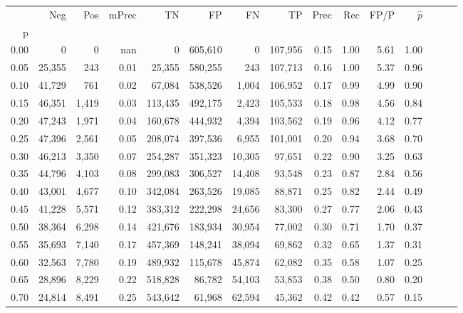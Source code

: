 \begin{tabular}{rrrrrrrrrrrrrrr}
\toprule
{} &     Neg &    Pos & mPrec &       TN &       FP &       FN &       TP &  Prec &   Rec &  FP/P & $\hat{p}$ \\
p    &         &        &       &          &          &          &          &       &       &       &           \\
\midrule
0.00 &       0 &      0 &   nan &        0 &  605,610 &        0 &  107,956 &  0.15 &  1.00 &  5.61 &      1.00 \\
0.05 &  25,355 &    243 &  0.01 &   25,355 &  580,255 &      243 &  107,713 &  0.16 &  1.00 &  5.37 &      0.96 \\
0.10 &  41,729 &    761 &  0.02 &   67,084 &  538,526 &    1,004 &  106,952 &  0.17 &  0.99 &  4.99 &      0.90 \\
0.15 &  46,351 &  1,419 &  0.03 &  113,435 &  492,175 &    2,423 &  105,533 &  0.18 &  0.98 &  4.56 &      0.84 \\
0.20 &  47,243 &  1,971 &  0.04 &  160,678 &  444,932 &    4,394 &  103,562 &  0.19 &  0.96 &  4.12 &      0.77 \\
0.25 &  47,396 &  2,561 &  0.05 &  208,074 &  397,536 &    6,955 &  101,001 &  0.20 &  0.94 &  3.68 &      0.70 \\
0.30 &  46,213 &  3,350 &  0.07 &  254,287 &  351,323 &   10,305 &   97,651 &  0.22 &  0.90 &  3.25 &      0.63 \\
0.35 &  44,796 &  4,103 &  0.08 &  299,083 &  306,527 &   14,408 &   93,548 &  0.23 &  0.87 &  2.84 &      0.56 \\
0.40 &  43,001 &  4,677 &  0.10 &  342,084 &  263,526 &   19,085 &   88,871 &  0.25 &  0.82 &  2.44 &      0.49 \\
0.45 &  41,228 &  5,571 &  0.12 &  383,312 &  222,298 &   24,656 &   83,300 &  0.27 &  0.77 &  2.06 &      0.43 \\
0.50 &  38,364 &  6,298 &  0.14 &  421,676 &  183,934 &   30,954 &   77,002 &  0.30 &  0.71 &  1.70 &      0.37 \\
0.55 &  35,693 &  7,140 &  0.17 &  457,369 &  148,241 &   38,094 &   69,862 &  0.32 &  0.65 &  1.37 &      0.31 \\
0.60 &  32,563 &  7,780 &  0.19 &  489,932 &  115,678 &   45,874 &   62,082 &  0.35 &  0.58 &  1.07 &      0.25 \\
0.65 &  28,896 &  8,229 &  0.22 &  518,828 &   86,782 &   54,103 &   53,853 &  0.38 &  0.50 &  0.80 &      0.20 \\
0.70 &  24,814 &  8,491 &  0.25 &  543,642 &   61,968 &   62,594 &   45,362 &  0.42 &  0.42 &  0.57 &      0.15 \\

\end{tabular}
